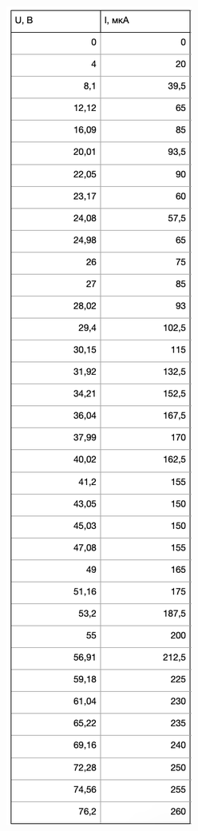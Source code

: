 \documentclass[a4paper]{article}
\begin{document}
\begin{enumerate}
\begin{figure}[H]
	\begin{center}
	\begin{minipage}[h]{0.3\linewidth}
	\includegraphics[width=1\linewidth]{t1.png}

\end{minipage}
\end{center}
\end{figure}
\end{enumerate}
\end{document}
